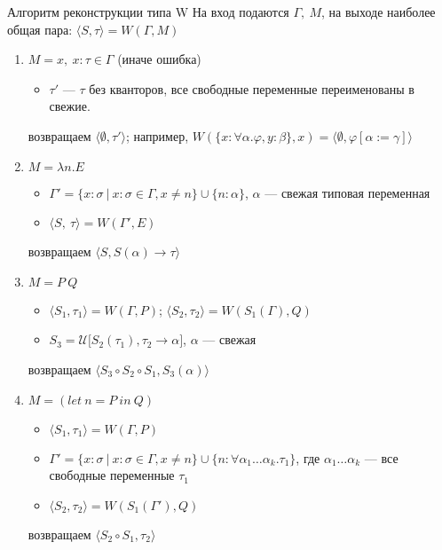 \documentclass[aspectratio=169]{beamer}
\begin{document}
\begin{frame}{Алгоритм реконструкции типа W}
На вход подаются $\Gamma,\ M$, на выходе наиболее общая пара: $\langle S, \tau \rangle = W(\Gamma,M)$
\begin{enumerate}
    \item $M = x ,\ x:\tau  \in \Gamma$ (иначе ошибка)
    \begin{itemize}
        \item $\tau'$ --- $\tau$ без кванторов, все свободные переменные переименованы в свежие.
    \end{itemize}
    возвращаем $\langle\emptyset, \tau'\rangle$; например, $W(\{x:\forall \alpha.\varphi, y:\beta\}, x) = \langle\emptyset,\varphi[\alpha:=\gamma]\rangle$
    \item $M = \lambda n.E$
    \begin{itemize}
        \item $\Gamma' = \{x : \sigma\ |\ x:\sigma \in \Gamma, x \ne n\} \cup \{n : \alpha\}$, $\alpha$ --- свежая типовая переменная
        \item $\langle S,\ \tau \rangle = W(\Gamma', E)$
    \end{itemize}
    возвращаем $\langle S, S(\alpha) \rightarrow \tau\rangle$
    \item $M = P\ Q$
    \begin{itemize}
        \item $\langle S_1, \tau_1 \rangle = W(\Gamma, P)$; $\langle S_2, \tau_2 \rangle = W(S_1(\Gamma), Q)$
        \item $S_3 = \mathcal{U}\big[S_2(\tau_1), \tau_2 \rightarrow \alpha\big]$, $\alpha$ --- свежая
    \end{itemize}
    возвращаем $\langle S_3 \circ S_2 \circ S_1, S_3(\alpha) \rangle$
    \item $M = (let\ n = P\ in\ Q)$
    \begin{itemize}
        \item $\langle S_1, \tau_1\rangle = W(\Gamma, P)$
        \item $\Gamma' = \{x:\sigma\ |\ x:\sigma\in\Gamma,x \ne n\} \cup \{ n : \forall \alpha_1 \dots \alpha_k. \tau_1 \}$, где $\alpha_1 \dots \alpha_k$ --- все свободные переменные $\tau_1$
        \item $\langle S_2, \tau_2\rangle = W(S_1(\Gamma'), Q)$
    \end{itemize}
    возвращаем $\langle S_2 \circ S_1, \tau_2 \rangle$
\end{enumerate}
\end{frame}
\end{document}
